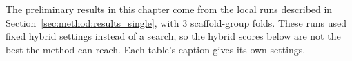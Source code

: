 

The preliminary results in this chapter come from the local runs described in Section~\ref{sec:method:results_single}, with 3 scaffold-group folds. These runs used fixed hybrid settings instead of a search, so the hybrid scores below are not the best the method can reach. Each table's caption gives its own settings.

